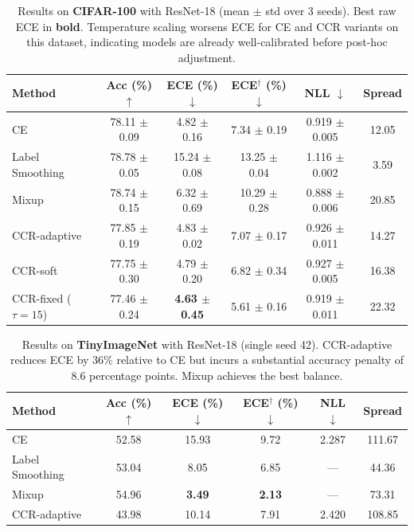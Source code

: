 \documentclass{article}
\begin{document}
\begin{table}[t]
\caption{Results on \textbf{CIFAR-100} with ResNet-18 (mean $\pm$ std over 3 seeds). Best raw ECE in \textbf{bold}. Temperature scaling worsens ECE for CE and CCR variants on this dataset, indicating models are already well-calibrated before post-hoc adjustment.}
\label{tab:main_cifar100}
\centering
\small
\begin{tabular}{lccccc}
\toprule
Method & Acc (\%) $\uparrow$ & ECE (\%) $\downarrow$ & ECE$^\dagger$ (\%) $\downarrow$ & NLL $\downarrow$ & Spread \\
\midrule
CE & 78.11 $\pm$ 0.09 & 4.82 $\pm$ 0.16 & 7.34 $\pm$ 0.19 & 0.919 $\pm$ 0.005 & 12.05 \\
Label Smoothing & 78.78 $\pm$ 0.05 & 15.24 $\pm$ 0.08 & 13.25 $\pm$ 0.04 & 1.116 $\pm$ 0.002 & 3.59 \\
Mixup & 78.74 $\pm$ 0.15 & 6.32 $\pm$ 0.69 & 10.29 $\pm$ 0.28 & 0.888 $\pm$ 0.006 & 20.85 \\
\midrule
CCR-adaptive & 77.85 $\pm$ 0.19 & 4.83 $\pm$ 0.02 & 7.07 $\pm$ 0.17 & 0.926 $\pm$ 0.011 & 14.27 \\
CCR-soft & 77.75 $\pm$ 0.30 & 4.79 $\pm$ 0.20 & 6.82 $\pm$ 0.34 & 0.927 $\pm$ 0.005 & 16.38 \\
CCR-fixed ($\tau\!=\!15$) & 77.46 $\pm$ 0.24 & \textbf{4.63 $\pm$ 0.45} & 5.61 $\pm$ 0.16 & 0.919 $\pm$ 0.011 & 22.32 \\
\bottomrule
\end{tabular}
\end{table}

\begin{table}[t]
\caption{Results on \textbf{TinyImageNet} with ResNet-18 (single seed 42). CCR-adaptive reduces ECE by 36\% relative to CE but incurs a substantial accuracy penalty of 8.6 percentage points. Mixup achieves the best balance.}
\label{tab:main_tinyimagenet}
\centering
\small
\begin{tabular}{lccccc}
\toprule
Method & Acc (\%) $\uparrow$ & ECE (\%) $\downarrow$ & ECE$^\dagger$ (\%) $\downarrow$ & NLL $\downarrow$ & Spread \\
\midrule
CE & 52.58 & 15.93 & 9.72 & 2.287 & 111.67 \\
Label Smoothing & 53.04 & 8.05 & 6.85 & --- & 44.36 \\
Mixup & 54.96 & \textbf{3.49} & \textbf{2.13} & --- & 73.31 \\
\midrule
CCR-adaptive & 43.98 & 10.14 & 7.91 & 2.420 & 108.85 \\
\bottomrule
\end{tabular}
\end{table}
\end{document}
